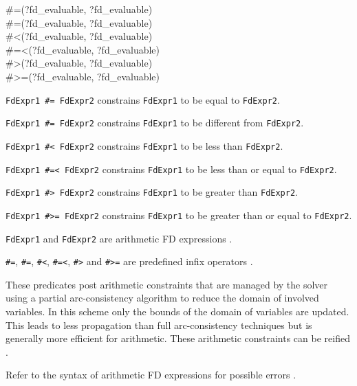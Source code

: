 \begin{TemplatesOneCol}
\#=(?fd\_evaluable, ?fd\_evaluable)\\
\#{\bs}=(?fd\_evaluable, ?fd\_evaluable)\\
\#<(?fd\_evaluable, ?fd\_evaluable)\\
\#=<(?fd\_evaluable, ?fd\_evaluable)\\
\#>(?fd\_evaluable, ?fd\_evaluable)\\
\#>=(?fd\_evaluable, ?fd\_evaluable)

\end{TemplatesOneCol}

\Description

\texttt{FdExpr1 \#= FdExpr2} constrains \texttt{FdExpr1} to be
equal to \texttt{FdExpr2}.

\texttt{FdExpr1 \#{\bs}= FdExpr2} constrains \texttt{FdExpr1}
to be different from \texttt{FdExpr2}.

\texttt{FdExpr1 \#< FdExpr2} constrains \texttt{FdExpr1} to
be less than \texttt{FdExpr2}.

\texttt{FdExpr1 \#=< FdExpr2} constrains \texttt{FdExpr1}
to be less than or equal to \texttt{FdExpr2}.

\texttt{FdExpr1 \#> FdExpr2} constrains \texttt{FdExpr1} to
be greater than \texttt{FdExpr2}.

\texttt{FdExpr1 \#>= FdExpr2} constrains \texttt{FdExpr1}
to be greater than or equal to \texttt{FdExpr2}.

\texttt{FdExpr1} and \texttt{FdExpr2} are arithmetic FD expressions
.

\texttt{\#=}, \texttt{\#{\bs}=}, \texttt{\#<}, \texttt{\#=<},
\texttt{\#>} and \texttt{\#>=} are predefined infix operators
.

These predicates post arithmetic constraints that are managed by the solver
using a partial arc-consistency algorithm to reduce the domain of involved
variables. In this scheme only the bounds of the domain of variables are
updated. This leads to less propagation than full arc-consistency techniques
 but is generally more efficient for
arithmetic. These arithmetic constraints can be reified .

\Errors

Refer to the syntax of arithmetic FD expressions for possible errors
.

\Portability

